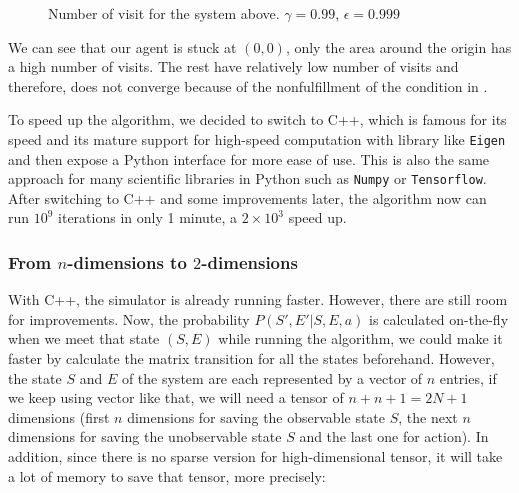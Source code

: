 \documentclass[
  a4paper, xcolor = usenames,dvipsnames]{article}
\newcommand{\passthrough}[1]{#1}
\theoremstyle{definition}
\theoremstyle{definition}
\theoremstyle{definition}
\theoremstyle{definition}
\theoremstyle{remark}
\begin{document}
\begin{figure}

{\centering {}

}

\caption{Number of visit for the system above. $\gamma = 0.99$, $\epsilon = 0.999$}\label{fig:10x10-python-n-visit}
\end{figure}

We can see that our agent is stuck at \((0, 0)\), only the area around the origin has a high number of visits. The rest have relatively low number of visits and therefore, does not converge because of the nonfulfillment of the condition in \autocite{q-learning-converge}.

To speed up the algorithm, we decided to switch to C++, which is famous for its speed and its mature support for high-speed computation with library like \passthrough{\lstinline!Eigen!} and then expose a Python interface for more ease of use. This is also the same approach for many scientific libraries in Python such as \passthrough{\lstinline!Numpy!} or \passthrough{\lstinline!Tensorflow!}. After switching to C++ and some improvements later, the algorithm now can run \(10^9\) iterations in only 1 minute, a \(2 \times 10^3\) speed up.

\hypertarget{from-n-dimensions-to-2-dimensions}{%
\subsubsection{\texorpdfstring{From \(n\)-dimensions to \(2\)-dimensions}{From n-dimensions to 2-dimensions}}\label{from-n-dimensions-to-2-dimensions}}

With C++, the simulator is already running faster. However, there are still room for improvements. Now, the probability \(P(S', E' | S, E, a)\) is calculated on-the-fly when we meet that state \((S, E)\) while running the algorithm, we could make it faster by calculate the matrix transition for all the states beforehand. However, the state \(S\) and \(E\) of the system are each represented by a vector of \(n\) entries, if we keep using vector like that, we will need a tensor of \(n + n + 1 = 2N + 1\) dimensions (first \(n\) dimensions for saving the observable state \(S\), the next \(n\) dimensions for saving the unobservable state \(S\) and the last one for action). In addition, since there is no sparse version for high-dimensional tensor, it will take a lot of memory to save that tensor, more precisely:
\end{document}
